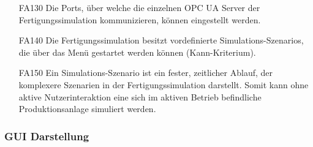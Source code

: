\documentclass[parskip=full]{scrartcl}
\begin{document}
\begin{enumerate}
\item[FA130] Die Ports, über welche die einzelnen \gls{OPC UA} Server der \gls{Fertigungssimulation} kommunizieren, können eingestellt werden.
\item[FA140] Die \gls{Fertigungssimulation} besitzt vordefinierte \glspl{Simulations-Szenario}, die über das Menü gestartet werden können (Kann-Kriterium).
\item[FA150] Ein \gls{Simulations-Szenario} ist ein fester, zeitlicher Ablauf, der komplexere Szenarien in der \gls{Fertigungssimulation} darstellt. Somit kann ohne aktive Nutzerinteraktion eine sich
  im aktiven Betrieb befindliche \gls{Produktionsanlage} simuliert werden.
\end{enumerate}

\subsubsection{GUI Darstellung}
\end{document}

